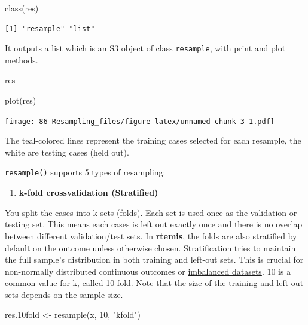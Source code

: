 \documentclass[
]{book}
\newenvironment{Shaded}{\begin{snugshade}}{\end{snugshade}}
\newcommand{\DecValTok}[1]{\textcolor[rgb]{0.00,0.00,0.81}{#1}}
\newcommand{\FloatTok}[1]{\textcolor[rgb]{0.00,0.00,0.81}{#1}}
\newcommand{\FunctionTok}[1]{\textcolor[rgb]{0.00,0.00,0.00}{#1}}
\newcommand{\NormalTok}[1]{#1}
\newcommand{\OtherTok}[1]{\textcolor[rgb]{0.56,0.35,0.01}{#1}}
\newcommand{\StringTok}[1]{\textcolor[rgb]{0.31,0.60,0.02}{#1}}
\providecommand{\tightlist}{%
  \setlength{\itemsep}{0pt}\setlength{\parskip}{0pt}}
\begin{document}
\begin{Shaded}
\begin{Highlighting}[]
\FunctionTok{class}\NormalTok{(res)}
\end{Highlighting}
\end{Shaded}

\begin{verbatim}
[1] "resample" "list"    
\end{verbatim}

It outputs a list which is an S3 object of class \texttt{resample}, with print and plot methods.

\begin{Shaded}
\begin{Highlighting}[]
\NormalTok{res}
\end{Highlighting}
\end{Shaded}

\begin{Shaded}
\begin{Highlighting}[]
\FunctionTok{plot}\NormalTok{(res)}
\end{Highlighting}
\end{Shaded}

\texttt{[image: 86-Resampling\_files/figure-latex/unnamed-chunk-3-1.pdf]}

The teal-colored lines represent the training cases selected for each resample, the white are testing cases (held out).

\texttt{resample()} supports 5 types of resampling:

\begin{enumerate}
\def\labelenumi{\arabic{enumi}.}
\tightlist
\item
  \textbf{k-fold crossvalidation (Stratified)}
\end{enumerate}

You split the cases into k sets (folds). Each set is used once as the validation or testing set. This means each cases is left out exactly once and there is no overlap between different validation/test sets. In \textbf{rtemis}, the folds are also stratified by default on the outcome unless otherwise chosen. Stratification tries to maintain the full sample's distribution in both training and left-out sets. This is crucial for non-normally distributed continuous outcomes or \protect\hyperlink{imbalanced}{imbalanced datasets}. 10 is a common value for k, called 10-fold. Note that the size of the training and left-out sets depends on the sample size.

\begin{Shaded}
\begin{Highlighting}[]
\NormalTok{res}\FloatTok{.10}\NormalTok{fold }\OtherTok{\textless{}{-}} \FunctionTok{resample}\NormalTok{(x, }\DecValTok{10}\NormalTok{, }\StringTok{"kfold"}\NormalTok{)}
\end{Highlighting}
\end{Shaded}
\end{document}
